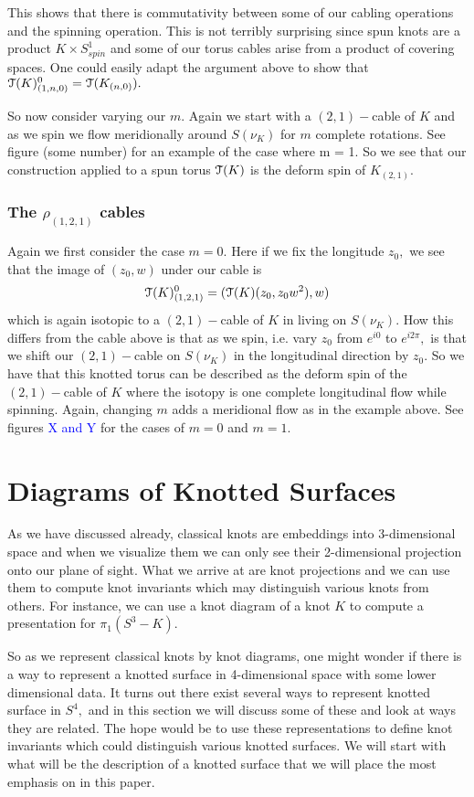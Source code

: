 \documentclass[a4paper, 12 pt, reqno]{amsart}
\theoremstyle{definition}
\theoremstyle{remark}
\begin{document}
This shows that there is commutativity between some of our cabling operations and the spinning operation. This is not terribly surprising since spun knots are a product $K \times S^{1}_{spin}$ and some of our torus cables arise from a product of covering spaces. One could easily adapt the argument above to show that $\mathcal T(K)^{0}_{(1,n, 0)} = \mathcal T(K_{(n, 0)}).$ 

So now consider varying our $m.$ Again we start with a $(2, 1)-$cable of $K$ and as we spin we flow meridionally around $S(\nu_{K})$ for $m$ complete rotations. See figure (some number) for an example of the case where m = 1. So we see that our construction applied to a spun torus $\mathcal T(K)$ is the deform spin of $K_{(2, 1)}.$

\subsubsection{The $\rho_{(1,2,1)}$ cables} Again we first consider the case $m = 0.$ Here if we fix the longitude $z_{0},$ we see that the image of $(z_{0}, w)$ under our cable is $$\mathcal T(K)^{0}_{(1, 2, 1)} = (\mathcal T(K)(z_{0}, z_{0}w^{2}), w)$$ which is again isotopic to a $(2, 1)-$cable of $K$ in living on $S(\nu_{K}).$ How this differs from the cable above is that as we spin, i.e. vary $z_{0}$ from $e^{i0}$ to $e^{i2\pi},$ is that we shift our $(2, 1)-$cable on $S(\nu_{K})$ in the longitudinal direction by $z_{0}.$ So we have that this knotted torus can be described as the deform spin of the $(2, 1)-$cable of $K$ where the isotopy is one complete longitudinal flow while spinning. Again, changing $m$ adds a meridional flow as in the example above. See figures \textcolor{blue}{X and Y} for the cases of $m = 0$ and $m = 1.$
 

\section{Diagrams of Knotted Surfaces}
As we have discussed already, classical knots are embeddings into 3-dimensional space and when we visualize them we can only see their 2-dimensional projection onto our plane of sight. What we arrive at are knot projections and we can use them to compute knot invariants which may distinguish various knots from others. For instance, we can use a knot diagram of a knot $K$ to compute a presentation for $\pi_{1}(S^{3} - K).$ 

So as we represent classical knots by knot diagrams, one might wonder if there is a way to represent a knotted surface in 4-dimensional space with some lower dimensional data. It turns out there exist several ways to represent knotted surface in $S^{4},$ and in this section we will discuss some of these and look at ways they are related. The hope would be to use these representations to define knot invariants which could distinguish various knotted surfaces. We will start with what will be the description of a knotted surface that we will place the most emphasis on in this paper.
\end{document}
